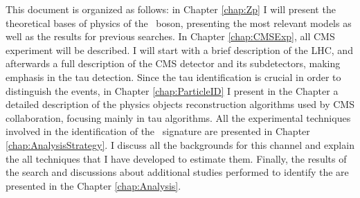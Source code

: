 This document is organized as follows: in Chapter \ref{chap:Zp} I will present the theoretical bases of physics of 
the \Zprime~boson, presenting the most relevant models as well as the results for previous searches. In 
Chapter \ref{chap:CMSExp}, all CMS experiment will be described. I will start with a brief description 
of the LHC, and afterwards a full description of the CMS detector and its subdetectors, making emphasis 
in the tau detection. Since the tau identification is crucial in order to distinguish the \Zprime events, in Chapter \ref{chap:ParticleID}
I present in the Chapter  a detailed description of the physics objects reconstruction algorithms used
by CMS collaboration, focusing mainly in tau algorithms. All the experimental techniques involved in the 
identification of the \Zprimetotauh~signature are presented in Chapter \ref{chap:AnalysisStrategy}. 
I discuss all the backgrounds for this channel and explain the all techniques that I have developed 
to estimate them. Finally, the results of the search and discussions about additional studies performed to identify the \Zprime 
are presented in the Chapter \ref{chap:Analysis}.


